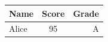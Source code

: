 \begin{tabular}{|l|c|r|}
\hline
Name & Score & Grade \\
\hline
Alice & 95 & A \\
\hline
\end{tabular}
